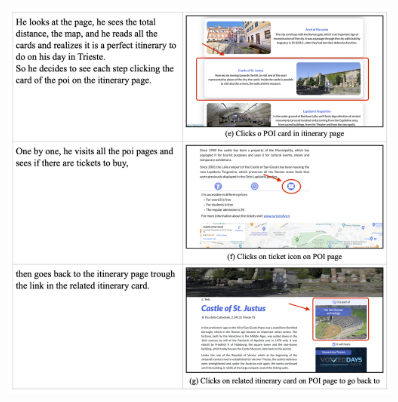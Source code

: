 \documentclass[table, 12pt]{article}
\begin{document}
\begin{figure}[H]
    \begin{center}
        \includegraphics[width=0.9\textwidth]{assets/Scenarios/scenario2-2.png}
    \end{center}
\end{figure}
\end{document}
